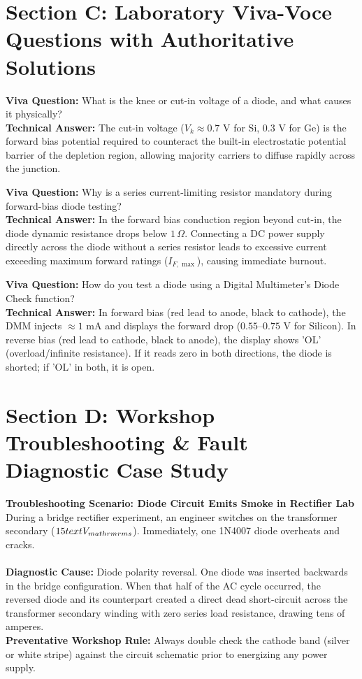 \section{Section C: Laboratory Viva-Voce Questions with Authoritative Solutions}

\noindent\textbf{Viva Question:} What is the knee or cut-in voltage of a diode, and what causes it physically?\\
\textbf{Technical Answer:} The cut-in voltage ($V_k \approx 0.7\text{ V}$ for Si, $0.3\text{ V}$ for Ge) is the forward bias potential required to counteract the built-in electrostatic potential barrier of the depletion region, allowing majority carriers to diffuse rapidly across the junction.
\vspace{3mm}

\noindent\textbf{Viva Question:} Why is a series current-limiting resistor mandatory during forward-bias diode testing?\\
\textbf{Technical Answer:} In the forward bias conduction region beyond cut-in, the diode dynamic resistance drops below $1\,\Omega$. Connecting a DC power supply directly across the diode without a series resistor leads to excessive current exceeding maximum forward ratings ($I_{F,\max}$), causing immediate burnout.
\vspace{3mm}

\noindent\textbf{Viva Question:} How do you test a diode using a Digital Multimeter's Diode Check function?\\
\textbf{Technical Answer:} In forward bias (red lead to anode, black to cathode), the DMM injects $\approx 1\text{ mA}$ and displays the forward drop ($0.55\text{--}0.75\text{ V}$ for Silicon). In reverse bias (red lead to cathode, black to anode), the display shows 'OL' (overload/infinite resistance). If it reads zero in both directions, the diode is shorted; if 'OL' in both, it is open.
\vspace{3mm}


\section{Section D: Workshop Troubleshooting \& Fault Diagnostic Case Study}

\textbf{Troubleshooting Scenario: Diode Circuit Emits Smoke in Rectifier Lab}\\
During a bridge rectifier experiment, an engineer switches on the transformer secondary ($15\\text{V}_{\\mathrm{rms}}$). Immediately, one 1N4007 diode overheats and cracks.\\\\
\textbf{Diagnostic Cause:} Diode polarity reversal. One diode was inserted backwards in the bridge configuration. When that half of the AC cycle occurred, the reversed diode and its counterpart created a direct dead short-circuit across the transformer secondary winding with zero series load resistance, drawing tens of amperes.\\
\textbf{Preventative Workshop Rule:} Always double check the cathode band (silver or white stripe) against the circuit schematic prior to energizing any power supply.
\vspace{4mm}
